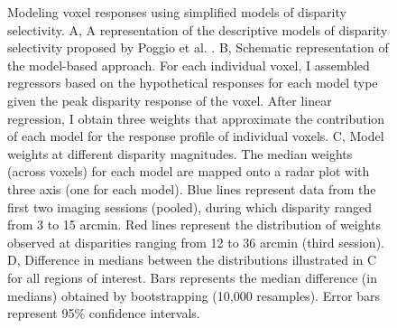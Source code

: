 \begin{figure}
  \caption[Modeling voxel responses using simplified models of disparity selectivity.]{Modeling voxel responses using simplified models of disparity selectivity. A, A representation of the descriptive models of disparity selectivity proposed by Poggio et al. \cite{Poggio:1988ij}. B, Schematic representation of the model-based approach. For each individual voxel, I assembled regressors based on the hypothetical responses for each model type given the peak disparity response of the voxel. After linear regression, I obtain three weights that approximate the contribution of each model for the response profile of individual voxels. C, Model weights at different disparity magnitudes. The median weights (across voxels) for each model are mapped onto a radar plot with three axis (one for each model). Blue lines represent data from the first two imaging sessions (pooled), during which disparity ranged from 3 to 15 arcmin. Red lines represent the distribution of weights observed at disparities ranging from 12 to 36 arcmin (third session). D, Difference in medians between the distributions illustrated in C for all regions of interest. Bars represents the median difference (in medians) obtained by bootstrapping (10,000 resamples). Error bars represent 95\% confidence intervals.}
  \label{fig:ch4fig7}
\end{figure}

